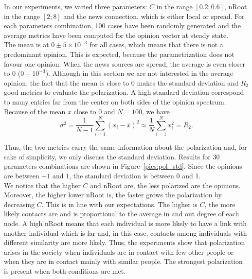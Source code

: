 In our experiments, we varied three parameters: $C$ in the range $[0.2; 0.6]$, nRoot in the range $[2; 8]$ and the news connection, which is either local or spread. For each parameters combination, 100 cases have been randomly generated and the average metrics have been computed for the opinion vector at steady state.\\

The mean is at  $0 \pm 5\times 10^{-3}$ for all cases, which means that there is not a predominant opinion. This is expected, because the parametrization does not favour one opinion. When the news sources are spread, the average is even closer to 0 ($0 \pm 10^{-3}$). Although in this section we are not interested in the average opinion, the fact that the mean is close to 0 makes the standard deviation and $R_2$ good metrics to evaluate the polarization. A high standard deviation correspond to many entries far from the center on both sides of the opinion spectrum.\\

Because of the mean $\overline{x}$ close to 0 and $N=100$, we have
$$ \sigma^2 = \frac{1}{N-1} \sum_{i=1}^N (x_i-\overline{x})^2 \approx \frac{1}{N} \sum_{i=1}^N x_i^2 = R_2.$$

Thus, the two metrics carry the same information about the polarization and, for sake of simplicity, we only discuss the standard deviation. Results for 30 parameters combinations are shown in Figure~\ref{pics:pol_std}. Since the opinions are between $-1$ and $1$, the standard deviation is between 0 and 1.\\

We notice that the higher $C$ and nRoot are, the less polarized are the opinions. Moreover, the higher lower nRoot is, the faster grows the polarization by decreasing $C$. This is in line with our expectations. The higher is $C$, the more likely contacts are and is proportional to the average in and out degree of each node. A high nRoot means that each individual is more likely to have a link with another individual which is far and, in this case, contacts among individuals with different similarity are more likely. Thus, the experiments show that polarization arises in the society when individuals are in contact with few other people or when they are in contact mainly with similar people. The strongest polarization is present when both conditions are met.\\

